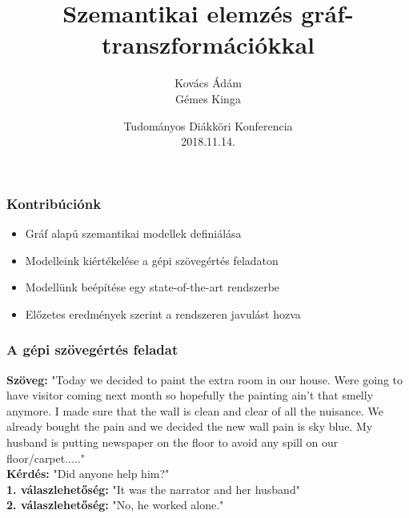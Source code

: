 \documentclass[bigger]{beamer}
\begin{document}
\title{Szemantikai elemz\'es gr\'af-transzform\'aci\'okkal}
\author{Kov\'acs \'Ad\'am \\ G\'emes Kinga}

\date{Tudományos Diákköri Konferencia\\2018.11.14.}


\begin{frame} 

\titlepage 

\end{frame} 


\begin{frame} 

    \frametitle{Kontribúciónk} 
    \begin{itemize}
        \pause \item Gráf alapú szemantikai modellek definiálása
        \pause \item Modelleink kiértékelése a gépi szövegértés feladaton
        \pause \item Modellünk beépítése egy state-of-the-art rendszerbe
        \pause \item Előzetes eredmények szerint a rendszeren javulást hozva
    \end{itemize}

\end{frame} 

\begin{frame}
	\frametitle{A gépi szövegértés feladat \citep{Chen:2018, Wang:2018}}
	\textbf{Sz\"oveg:} "Today we decided to paint the extra room in our house. Were going to have visitor coming next month so hopefully the painting ain't that smelly anymore. I made sure that the wall is clean and clear of all the nuisance. We already bought the pain and we decided the new wall pain is sky blue. My husband is putting newspaper on the floor to avoid any spill on our floor/carpet....." \\
	\textbf{Kérdés:} "Did anyone help him?" \\
	\textbf{1. v\'alaszlehet\H{o}s\'eg:} "It was the narrator and her husband" \\
	\textbf{2. v\'alaszlehet\H{o}s\'eg:} "No, he worked alone."
\end{frame}

\end{document}
